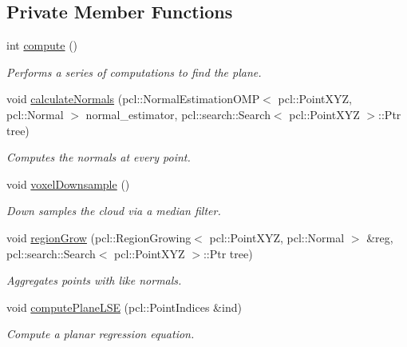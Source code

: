 \subsection*{Private Member Functions}
\begin{DoxyCompactItemize}
\item 
\hypertarget{class_plane_a50f718840ac2c5cc3226ff66de2c60f6}{}\label{class_plane_a50f718840ac2c5cc3226ff66de2c60f6} 
int \hyperlink{class_plane_a50f718840ac2c5cc3226ff66de2c60f6}{compute} ()
\begin{DoxyCompactList}\small\item\em Performs a series of computations to find the plane. \end{DoxyCompactList}\item 
void \hyperlink{class_plane_a5c856cf6a603473c68381d21a544d2a3}{calculate\+Normals} (pcl\+::\+Normal\+Estimation\+O\+MP$<$ pcl\+::\+Point\+X\+YZ, pcl\+::\+Normal $>$ normal\+\_\+estimator, pcl\+::search\+::\+Search$<$ pcl\+::\+Point\+X\+YZ $>$\+::Ptr tree)
\begin{DoxyCompactList}\small\item\em Computes the normals at every point. \end{DoxyCompactList}\item 
\hypertarget{class_plane_afc8f76c6dc7223c7d681d69e427a3004}{}\label{class_plane_afc8f76c6dc7223c7d681d69e427a3004} 
void \hyperlink{class_plane_afc8f76c6dc7223c7d681d69e427a3004}{voxel\+Downsample} ()
\begin{DoxyCompactList}\small\item\em Down samples the cloud via a median filter. \end{DoxyCompactList}\item 
void \hyperlink{class_plane_a08b35c23d8e0f3eea0db820163cda6e0}{region\+Grow} (pcl\+::\+Region\+Growing$<$ pcl\+::\+Point\+X\+YZ, pcl\+::\+Normal $>$ \&reg, pcl\+::search\+::\+Search$<$ pcl\+::\+Point\+X\+YZ $>$\+::Ptr tree)
\begin{DoxyCompactList}\small\item\em Aggregates points with like normals. \end{DoxyCompactList}\item 
void \hyperlink{class_plane_a503b1c82ae3a84d9bd88fbfa37a5e3be}{compute\+Plane\+L\+SE} (pcl\+::\+Point\+Indices \&ind)
\begin{DoxyCompactList}\small\item\em Compute a planar regression equation. \end{DoxyCompactList}\item 

\end{DoxyCompactItemize}
